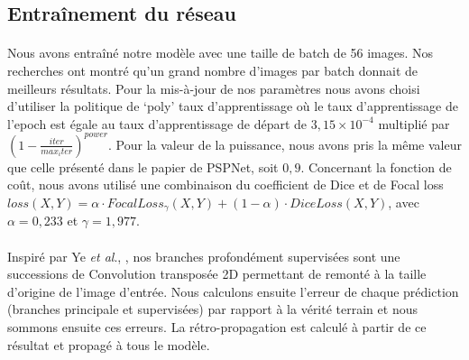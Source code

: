 \documentclass[french, english]{article}
\newcommand{\etal}{\textit{et al}., }
\begin{document}
\subsection{Entraînement du réseau}
\label{training}

\paragraph{}Nous avons entraîné notre modèle avec une taille de batch de 56 images. Nos recherches ont montré qu'un grand nombre d'images par batch donnait de meilleurs résultats. Pour la mis-à-jour de nos paramètres nous avons choisi d'utiliser la politique de `poly' taux d'apprentissage où le taux d'apprentissage de l'epoch est égale au taux d'apprentissage de départ de \(3,15\times 10^{-4}\) multiplié par $(1-\frac{iter}{max_iter})^{power}$. Pour la valeur de la puissance, nous avons pris la même valeur que celle présenté dans le papier de PSPNet, soit \(0,9\). Concernant la fonction de coût, nous avons utilisé une combinaison du coefficient de Dice et de Focal loss \(loss(X,Y) = \alpha \cdot FocalLoss_{\gamma}(X,Y)+(1-\alpha) \cdot DiceLoss(X,Y)\), avec \(\alpha=0,233\) et \(\gamma=1,977\).

\paragraph{}Inspiré par Ye \etal\cite{multidepth_fusion}, nos branches profondément supervisées sont une successions de Convolution transposée 2D permettant de remonté à la taille d'origine de l'image d'entrée. Nous calculons ensuite l'erreur de chaque prédiction (branches principale et supervisées) par rapport à la vérité terrain et nous sommons ensuite ces erreurs. La rétro-propagation est calculé à partir de ce résultat et propagé à tous le modèle.

\end{document}
